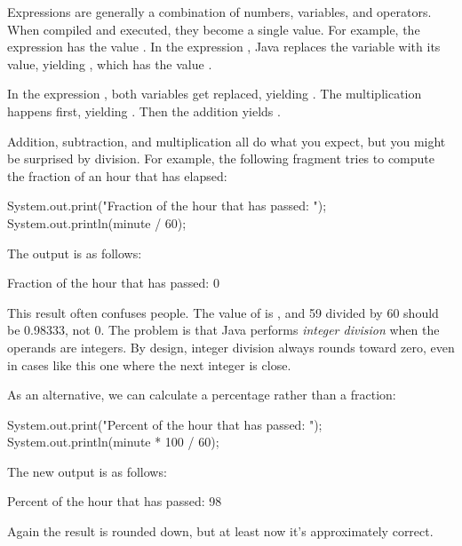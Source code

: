 Expressions are generally a combination of numbers, variables, and operators.
When compiled and executed, they become a single value.
For example, the expression  has the value .
In the expression , Java replaces the variable with its value, yielding , which has the value .

In the expression , both variables get replaced, yielding .
The multiplication happens first, yielding .
Then the addition yields .

Addition, subtraction, and multiplication all do what you expect, but you might be surprised by division.
For example, the following fragment tries to compute the fraction of an hour that has elapsed:%

\begin{code}
System.out.print("Fraction of the hour that has passed: ");
System.out.println(minute / 60);
\end{code}

The output is as follows:

\begin{stdout}
Fraction of the hour that has passed: 0
\end{stdout}


This result often confuses people.
The value of  is , and 59 divided by 60 should be 0.98333, not 0.
The problem is that Java performs {\em integer division} when the operands are integers.
By design, integer division always rounds toward zero, even in cases like this one where the next integer is close.

As an alternative, we can calculate a percentage rather than a fraction:

\begin{code}
System.out.print("Percent of the hour that has passed: ");
System.out.println(minute * 100 / 60);
\end{code}

The new output is as follows:

\begin{stdout}
Percent of the hour that has passed: 98
\end{stdout}

Again the result is rounded down, but at least now it's approximately correct.


